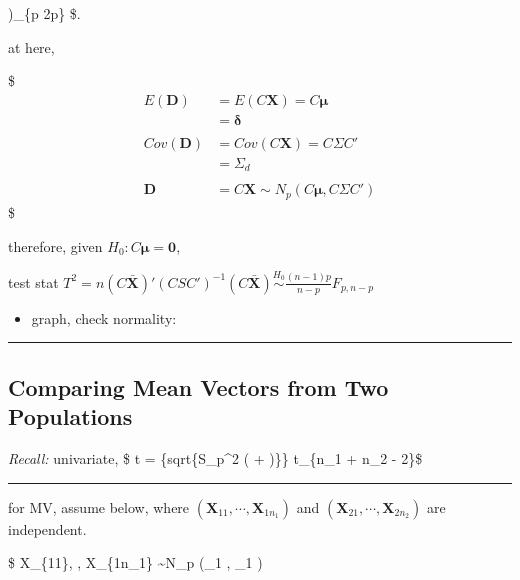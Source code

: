 \documentclass[
]{book}
\providecommand{\tightlist}{%
  \setlength{\itemsep}{0pt}\setlength{\parskip}{0pt}}
\begin{document}
{{{\right)\_\{p \times 2p\} \$.

at here,

\$
\begin{align*}

E(\pmb D) 
&= E(C \pmb X) = C \pmb \mu \\ 
&= \pmb \delta\\
\\

Cov(\pmb D)  
&= Cov(C \pmb X) = C \Sigma C' \\ 
&= \Sigma_d\\

\\

\pmb D &= C \pmb X \sim N_p (C \pmb \mu, C \Sigma C')

\end{align*}
\$

therefore, given \(H_0 : C \pmb \mu = \pmb 0\),

test stat \(T^2 = n (C \bar {\pmb X})' (CSC')^{-1} (C \bar {\pmb X}) \overset {H_0}{\sim} \tfrac{(n-1)p}{n-p} F_{p, n-p}\)

\begin{itemize}
\tightlist
\item
  graph, check normality:
\end{itemize}

\begin{center}\rule{0.5\linewidth}{0.5pt}\end{center}

\hypertarget{comparing-mean-vectors-from-two-populations}{%
\subsection{Comparing Mean Vectors from Two Populations}\label{comparing-mean-vectors-from-two-populations}}

\emph{Recall:}
univariate, \$ t =  \{sqrt\{S\_p\^{}2 \left(  + \right)\}\}  t\_\{n\_1 + n\_2 - 2\}\$

\begin{center}\rule{0.5\linewidth}{0.5pt}\end{center}

for MV, assume below, where \((\pmb X_{11}, \cdots, \pmb X_{1n_1})\) and \((\pmb X_{21}, \cdots, \pmb X_{2n_2})\) are independent.

\$
\pmb X\_\{11\}, \cdots, \pmb X\_\{1n\_1\} \sim N\_p (\pmb \mu\_1 , \Sigma\_1 )

}}}
\end{document}
